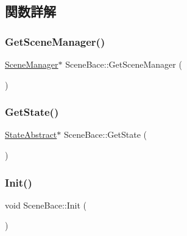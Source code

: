\subsection{関数詳解}
\mbox{\label{class_scene_bace_a8cfd7bba9c0e11ce551dd63b064df8fe}} 
\subsubsection{\texorpdfstring{Get\+Scene\+Manager()}{GetSceneManager()}}
{\footnotesize\ttfamily \mbox{\hyperlink{class_scene_manager}{Scene\+Manager}}$\ast$ Scene\+Bace\+::\+Get\+Scene\+Manager (\begin{DoxyParamCaption}{ }\end{DoxyParamCaption})\hspace{0.3cm}{\ttfamily [inline]}}

\mbox{\label{class_scene_bace_a40c4a427ff64b30ea6dfd913f2818478}} 
\subsubsection{\texorpdfstring{Get\+State()}{GetState()}}
{\footnotesize\ttfamily \mbox{\hyperlink{class_scene_bace_1_1_state_abstract}{State\+Abstract}}$\ast$ Scene\+Bace\+::\+Get\+State (\begin{DoxyParamCaption}{ }\end{DoxyParamCaption})\hspace{0.3cm}{\ttfamily [inline]}}

\mbox{\label{class_scene_bace_a6e344661a3b5c04b3dfa810f5e1127e4}} 
\subsubsection{\texorpdfstring{Init()}{Init()}}
{\footnotesize\ttfamily void Scene\+Bace\+::\+Init (\begin{DoxyParamCaption}{ }\end{DoxyParamCaption})}



